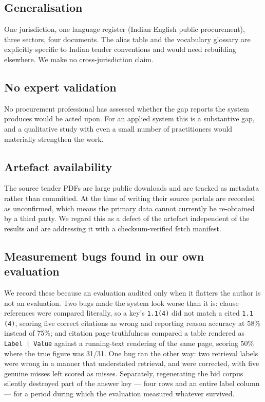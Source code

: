 \documentclass[conference]{IEEEtran}
\begin{document}
\subsection{Generalisation}

One jurisdiction, one language register (Indian English public procurement),
three sectors, four documents. The alias table and the vocabulary glossary are
explicitly specific to Indian tender conventions and would need rebuilding
elsewhere. We make no cross-jurisdiction claim.

\subsection{No expert validation}

No procurement professional has assessed whether the gap reports the system
produces would be acted upon. For an applied system this is a substantive gap,
and a qualitative study with even a small number of practitioners would
materially strengthen the work.

\subsection{Artefact availability}

The source tender PDFs are large public downloads and are tracked as metadata
rather than committed. At the time of writing their source portals are recorded
as unconfirmed, which means the primary data cannot currently be re-obtained by
a third party. We regard this as a defect of the artefact independent of the
results and are addressing it with a checksum-verified fetch manifest.

\subsection{Measurement bugs found in our own evaluation}

We record these because an evaluation audited only when it flatters the author
is not an evaluation. Two bugs made the system look worse than it is: clause
references were compared literally, so a key's \texttt{1.1(4)} did not match a
cited \texttt{1.1 (4)}, scoring five correct citations as wrong and reporting
reason accuracy at 58\% instead of 75\%; and citation page-truthfulness compared
a table rendered as \texttt{Label | Value} against a running-text rendering of
the same page, scoring 50\% where the true figure was 31/31. One bug ran the
other way: two retrieval labels were wrong in a manner that understated
retrieval, and were corrected, with five genuine misses left scored as misses.
Separately, regenerating the bid corpus silently destroyed part of the answer
key --- four rows and an entire label column --- for a period during which the
evaluation measured whatever survived.
\end{document}
